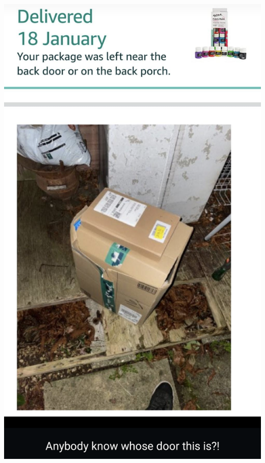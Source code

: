 \documentclass{minimal}
\begin{document}
\vspace*{\fill}
\centering
\includegraphics[width=0.4\textheight]{Screenshot_20231012-111658.png}
\hspace{5cm}
\end{document}
